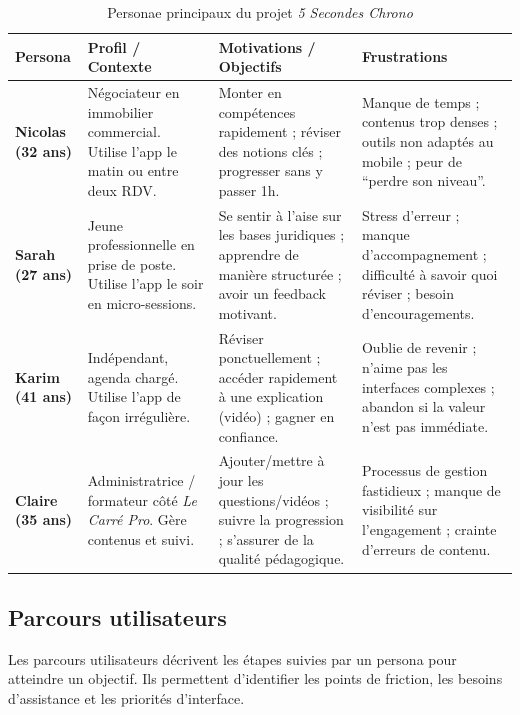 \begin{table}[h!]
\centering
\renewcommand{\arraystretch}{1.2}
\small
\begin{tabular}{|p{2.6cm}|p{3.2cm}|p{4.9cm}|p{4.9cm}|}
\hline
\rowcolor{etnaBlue!15}
\textbf{Persona} & \textbf{Profil / Contexte} & \textbf{Motivations / Objectifs} & \textbf{Frustrations} \\ \hline

\textbf{Nicolas (32 ans)} &
Négociateur en immobilier commercial. Utilise l’app le matin ou entre deux RDV. &
Monter en compétences rapidement ; réviser des notions clés ; progresser sans y passer 1h. &
Manque de temps ; contenus trop denses ; outils non adaptés au mobile ; peur de ``perdre son niveau''. \\ \hline

\textbf{Sarah (27 ans)} &
Jeune professionnelle en prise de poste. Utilise l’app le soir en micro-sessions. &
Se sentir à l’aise sur les bases juridiques ; apprendre de manière structurée ; avoir un feedback motivant. &
Stress d’erreur ; manque d’accompagnement ; difficulté à savoir quoi réviser ; besoin d’encouragements. \\ \hline

\textbf{Karim (41 ans)} &
Indépendant, agenda chargé. Utilise l’app de façon irrégulière. &
Réviser ponctuellement ; accéder rapidement à une explication (vidéo) ; gagner en confiance. &
Oublie de revenir ; n’aime pas les interfaces complexes ; abandon si la valeur n’est pas immédiate. \\ \hline

\textbf{Claire (35 ans)} &
Administratrice / formateur côté \emph{Le Carré Pro}. Gère contenus et suivi. &
Ajouter/mettre à jour les questions/vidéos ; suivre la progression ; s’assurer de la qualité pédagogique. &
Processus de gestion fastidieux ; manque de visibilité sur l’engagement ; crainte d’erreurs de contenu. \\ \hline

\end{tabular}
\caption{Personae principaux du projet \emph{5 Secondes Chrono}}
\end{table}

\subsection{Parcours utilisateurs}

Les parcours utilisateurs décrivent les étapes suivies par un persona pour atteindre un objectif.
Ils permettent d’identifier les points de friction, les besoins d’assistance et les priorités
d’interface.

